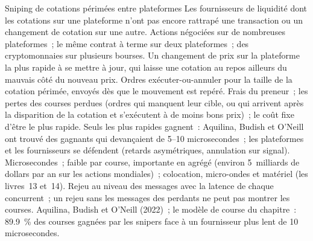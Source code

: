 \begin{strategyfile}{Sniping de cotations périmées entre plateformes}\label{strat:hf:latency-arbitrage-and-its-defence:snipe}
 Les fournisseurs de liquidité dont les cotations sur une plateforme n'ont pas encore rattrapé une transaction ou un changement de cotation sur une autre.
 Actions négociées sur de nombreuses plateformes~; le même contrat à terme sur deux plateformes~; des cryptomonnaies sur plusieurs bourses.
 Un changement de prix sur la plateforme la plus rapide à se mettre à jour, qui laisse une cotation au repos ailleurs du mauvais côté du nouveau prix.
 Ordres exécuter-ou-annuler pour la taille de la cotation périmée, envoyés dès que le mouvement est repéré.
 Frais du preneur~; les pertes des courses perdues (ordres qui manquent leur cible, ou qui arrivent après la disparition de la cotation et s'exécutent à de moins bons prix)~; le
coût fixe d'être le plus rapide.
 Seuls les plus rapides gagnent~: Aquilina, Budish et O'Neill ont trouvé des gagnants qui devançaient de 5--10 microsecondes~; les plateformes et les fournisseurs se défendent
(retards asymétriques, annulation sur signal).
 Microsecondes~; faible par course, importante en agrégé (environ 5~milliards de dollars par an sur les actions mondiales)~; colocation,
micro-ondes et matériel (les livres~13 et~14).
 Rejeu au niveau des messages avec la latence de chaque concurrent~; un rejeu sans les messages des perdants ne peut pas montrer les courses.
 Aquilina, Budish et O'Neill (2022)~; le modèle de course du chapitre~: 89.9~\% des courses gagnées par les snipers face à un fournisseur
plus lent de 10 microsecondes.
\end{strategyfile}

